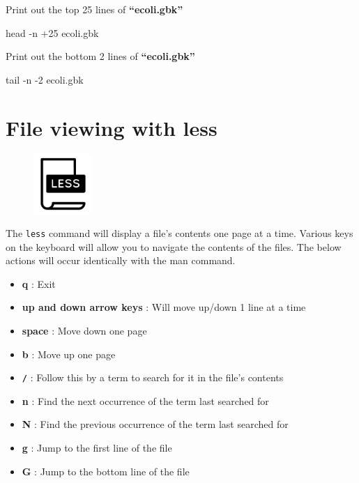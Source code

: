 \documentclass[
  letterpaper,
  DIV=11,
  numbers=noendperiod]{scrreprt}
\newenvironment{Shaded}{\begin{snugshade}}{\end{snugshade}}
\newcommand{\AttributeTok}[1]{\textcolor[rgb]{0.40,0.45,0.13}{#1}}
\newcommand{\FunctionTok}[1]{\textcolor[rgb]{0.28,0.35,0.67}{#1}}
\newcommand{\NormalTok}[1]{\textcolor[rgb]{0.00,0.23,0.31}{#1}}
\providecommand{\tightlist}{%
  \setlength{\itemsep}{0pt}\setlength{\parskip}{0pt}}\usepackage{longtable,booktabs,array}
\begin{document}
Print out the top 25 lines of \textbf{``ecoli.gbk''}

\begin{Shaded}
\begin{Highlighting}[]
\FunctionTok{head} \AttributeTok{{-}n}\NormalTok{ +25 ecoli.gbk}
\end{Highlighting}
\end{Shaded}

Print out the bottom 2 lines of \textbf{``ecoli.gbk''}

\begin{Shaded}
\begin{Highlighting}[]
\FunctionTok{tail} \AttributeTok{{-}n} \AttributeTok{{-}2}\NormalTok{ ecoli.gbk}
\end{Highlighting}
\end{Shaded}

\hypertarget{file-viewing-with-less}{%
\section{File viewing with less}\label{file-viewing-with-less}}

\begin{figure}

{\centering \includegraphics[width=0.2\textwidth,height=\textheight]{figures/less.png}

}

\end{figure}

The \texttt{less} command will display a file's contents one page at a
time. Various keys on the keyboard will allow you to navigate the
contents of the files. The below actions will occur identically with the
man command.

\begin{itemize}
\tightlist
\item
  \textbf{q} : Exit
\item
  \textbf{up and down arrow keys} : Will move up/down 1 line at a time
\item
  \textbf{space} : Move down one page
\item
  \textbf{b} : Move up one page
\item
  \textbf{\texttt{/}} : Follow this by a term to search for it in the
  file's contents
\item
  \textbf{n} : Find the next occurrence of the term last searched for
\item
  \textbf{N} : Find the previous occurrence of the term last searched
  for
\item
  \textbf{g} : Jump to the first line of the file
\item
  \textbf{G} : Jump to the bottom line of the file
\end{itemize}
\end{document}
